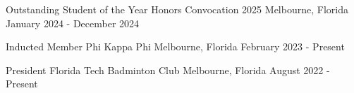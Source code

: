 


\begin{cventries}

\cventry
{Outstanding Student of the Year}
{Honors Convocation 2025}
{Melbourne, Florida}
{January 2024 - December 2024}
{}

\cventry
{Inducted Member}
{Phi Kappa Phi}
{Melbourne, Florida}
{February 2023 - Present}
{}

\cventry
{President} %
{Florida Tech Badminton Club} %
{Melbourne, Florida} %
{August 2022 - Present} %
{ %
}



\end{cventries}
